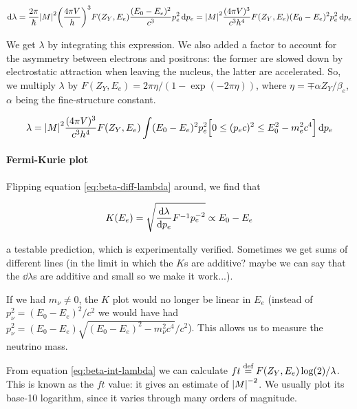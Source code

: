 \documentclass[main.tex]{subfiles}
\begin{document}
\begin{equation} \label{eq:beta-diff-lambda}
    \dd{\lambda}
    = \frac{2 \pi}{\hbar} \abs{M}^2  \qty(\frac{4 \pi V}{h})^3 F(Z_Y, E_e) \frac{(E_0 - E_e)^2}{c^3} p^2_e \dd{p_e}
    =  \abs{M}^2  \frac{(4 \pi V)^3}{c^3 h^4} F(Z_Y, E_e) (E_0 - E_e)^2 p^2_e \dd{p_e}
\end{equation}

We get \(\lambda\) by integrating this expression. We also added a factor to account for the asymmetry between electrons and positrons: the former are slowed down by electrostatic attraction when leaving the nucleus, the latter are accelerated. So, we multiply \(\lambda\) by \(F(Z_Y, E_e) = 2 \pi \eta / (1- \exp(-2 \pi \eta ))\), %
where \(\eta = \mp \alpha Z_Y / \beta_e\), \(\alpha\) being the fine-structure constant.

\begin{equation}\label{eq:beta-int-lambda}
    \lambda = \abs{M}^2  \frac{(4 \pi V)^3}{c^3 h^4} F(Z_Y, E_e) \int (E_0 - E_e)^2 p^2_e \qty[0 \leq (p_e c)^2 \leq E_0^2 - m_e^2 c^4] \dd{p_e}
\end{equation}

\paragraph{Fermi-Kurie plot}

Flipping equation \eqref{eq:beta-diff-lambda} around, we find that

\begin{equation}
    K(E_e) = \sqrt{ \dv{\lambda}{p_e} F^{-1} p_e^{-2} } \propto E_0 - E_e
\end{equation}

a testable prediction, which is experimentally verified. Sometimes we get sums of different lines (in the limit in which the \(K\)s are additive? maybe we can say that the \(\dd{\lambda} \)s are additive and small so we make it work...).

If we had \(m_\nu \neq 0\), the \(K\) plot would no longer be linear in \(E_e\) (instead of \(p_\nu^2 = (E_0 - E_e)^2/c^2\) we would have had \(p_\nu^2 = (E_0 - E_e) \sqrt{(E_0-E_e)^2 - m_\nu ^2 c^4} /c^2\)). This allows us to measure the neutrino mass.

From equation \eqref{eq:beta-int-lambda} we can calculate \(ft \stackrel{\text{def}}{=} F(Z_Y, E_e) \log(2) / \lambda \). This is known as the \(ft\) value: it gives an estimate of \(\abs{M}^{-2} \). We usually plot its base-10 logarithm, since it varies through many orders of magnitude.
\end{document}
